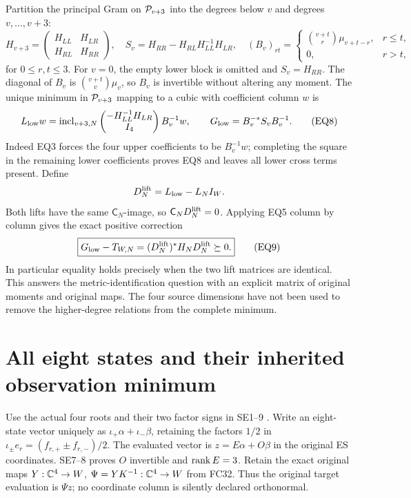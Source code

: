 Partition the principal Gram on $\mathcal P_{v+3}$ into the degrees below
$v$ and degrees $v,\ldots,v+3$:
\[
 H_{v+3}=\begin{pmatrix}H_{LL}&H_{LR}\\H_{RL}&H_{RR}\end{pmatrix},
 \quad S_v=H_{RR}-H_{RL}H_{LL}^{-1}H_{LR},
 \quad (B_v)_{rt}=\begin{cases}\binom{v+t}{r}\mu_{v+t-r},&r\le t,\\
 0,&r>t,\end{cases}                                                \tag{EQ7}
\]
for $0\le r,t\le3$. For $v=0$, the empty lower block is omitted
and $S_v=H_{RR}$. The diagonal of $B_v$ is
$\binom{v+t}{v}\mu_v$, so $B_v$ is invertible without altering
any moment. The unique minimum in $\mathcal P_{v+3}$ mapping to a cubic
with coefficient column $w$ is
\[
 L_{\rm low}w=\operatorname{incl}_{v+3,N}
 \begin{pmatrix}-H_{LL}^{-1}H_{LR}\\I_4\end{pmatrix}B_v^{-1}w,
 \qquad G_{\rm low}=B_v^{-*}S_vB_v^{-1}.                            \tag{EQ8}
\]
Indeed EQ3 forces the four upper coefficients to be $B_v^{-1}w$;
completing the square in the remaining lower coefficients proves
EQ8 and leaves all lower cross terms present. Define
\[
 D_N^{\rm lift}=L_{\rm low}-L_NI_W.
\]
Both lifts have the same $\mathsf C_N$-image, so
$\mathsf C_ND_N^{\rm lift}=0$. Applying EQ5 column by column gives
the exact positive correction
\[
 \boxed{G_{\rm low}-T_{W,N}
       =(D_N^{\rm lift})^*H_ND_N^{\rm lift}\succeq0.}                \tag{EQ9}
\]
In particular equality holds precisely when the two lift matrices
are identical. This answers the metric-identification question with
an explicit matrix of original moments and original maps. The four
source dimensions have not been used to remove the higher-degree
relations from the complete minimum.

\section{All eight states and their inherited observation minimum}
Use the actual four roots and their two factor signs in SE1--9
\cite{eightmin:FC}. Write an eight-state vector uniquely as
$\iota_+\alpha+\iota_-\beta$, retaining the factors $1/2$ in
$\iota_\pm e_r=(f_{r,+}\pm f_{r,-})/2$. The evaluated vector is
$z=E\alpha+O\beta$ in the original ES coordinates. SE7--8 proves
$O$ invertible and $\operatorname{rank} E=3$. Retain the exact original maps
$Y:\mathbb C^4\to W$, $\Psi=YK^{-1}:\mathbb C^4\to W$ from FC32.
Thus the original target evaluation is $\Psi z$; no coordinate
column is silently declared orthonormal.

